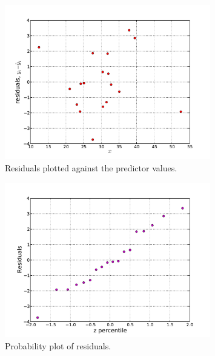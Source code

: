 \documentclass[a4paper, 11pt, titlepage]{article}
\begin{document}
\begin{figure}[htpb]
\centering
\includegraphics[width=0.8\textwidth]{residuals.pdf}
\caption{Residuals plotted against the predictor values. \label{fig:residuals}}
\end{figure}

\begin{figure}[htpb]
\centering
\includegraphics[width=0.8\textwidth]{probabilityplot2.pdf}
\caption{Probability plot of residuals. \label{fig:probplot2}}
\end{figure}
\end{document}
